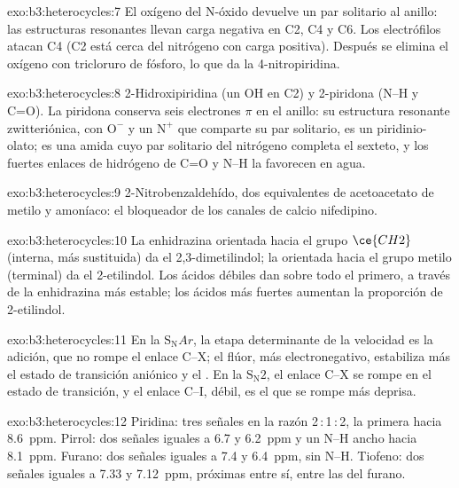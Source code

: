 \begin{solution}{exo:b3:heterocycles:7}
El oxígeno del N-óxido devuelve un par solitario al anillo: las estructuras
resonantes llevan carga negativa en C2, C4 y C6. Los electrófilos atacan C4 (C2
está cerca del nitrógeno con carga positiva). Después se elimina el oxígeno con
tricloruro de fósforo, lo que da la 4-nitropiridina.
\end{solution}

\begin{solution}{exo:b3:heterocycles:8}
2-Hidroxipiridina (un OH en C2) y 2-piridona (N--H y C=O). La piridona conserva seis
electrones $\pi$ en el anillo: su estructura resonante zwitteriónica, con $\mathrm{O^-}$ y un
$\mathrm{N^+}$ que comparte su par solitario, es un piridinio-olato; es una amida cuyo
par solitario del nitrógeno completa el sexteto, y los fuertes enlaces de hidrógeno de C=O y N--H
la favorecen en agua.
\end{solution}

\begin{solution}{exo:b3:heterocycles:9}
2-Nitrobenzaldehído, dos equivalentes de acetoacetato de metilo y amoníaco: el
bloqueador de los canales de calcio nifedipino.
\end{solution}

\begin{solution}{exo:b3:heterocycles:10}
La enhidrazina orientada hacia el grupo $\ce{CH2}$ (interna, más sustituida) da el
2,3-dimetilindol; la orientada hacia el grupo metilo (terminal) da el 2-etilindol.
Los ácidos débiles dan sobre todo el primero, a través de la enhidrazina más estable;
los ácidos más fuertes aumentan la proporción de 2-etilindol.
\end{solution}

\begin{solution}{exo:b3:heterocycles:11}
En la $\mathrm S_\mathrm NAr$, la etapa determinante de la velocidad es la adición, que no rompe el enlace C--X;
el flúor, más electronegativo, estabiliza más el estado de transición aniónico
y el . En la $\mathrm S_\mathrm N2$, el enlace C--X se rompe en el
estado de transición, y el enlace C--I, débil, es el que se rompe más deprisa.
\end{solution}

\begin{solution}{exo:b3:heterocycles:12}
Piridina: tres señales en la razón 2\,:\,1\,:\,2, la primera hacia \qty{8.6}{ppm}. Pirrol: dos señales iguales
a 6.7 y \qty{6.2}{ppm} y un N--H ancho hacia \qty{8.1}{ppm}. Furano: dos señales iguales a
7.4 y \qty{6.4}{ppm}, sin N--H. Tiofeno: dos señales iguales a 7.33 y \qty{7.12}{ppm}, próximas
entre sí, entre las del furano.
\end{solution}

